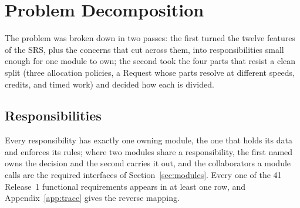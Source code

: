 \section{Problem Decomposition}\label{sec:decomp}

The problem was broken down in two passes: the first turned the twelve features of the SRS, plus the concerns that cut across them, into responsibilities small enough for one module to own; the second took the four parts that resist a clean split (three allocation policies, a Request whose parts resolve at different speeds, credits, and timed work) and decided how each is divided.

\subsection{Responsibilities}\label{sec:decomp-resp}

Every responsibility has exactly one owning module, the one that holds its data and enforces its rules; where two modules share a responsibility, the first named owns the decision and the second carries it out, and the collaborators a module calls are the required interfaces of Section~\ref{sec:modules}. Every one of the 41 Release~1 functional requirements appears in at least one row, and Appendix~\ref{app:trace} gives the reverse mapping.

